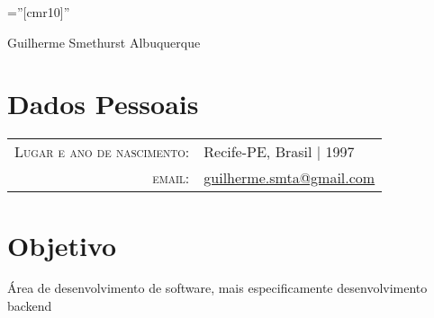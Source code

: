 \documentclass[a4paper,10pt]{article}
\begin{document}

\pagestyle{empty} %

\font\fb=''[cmr10]'' %

\par{\centering
		{\Huge Guilherme Smethurst Albuquerque
	}\bigskip\par}

\section{Dados Pessoais}

\begin{tabular}{rl}
    \textsc{Lugar e ano de nascimento:} & Recife-PE, Brasil  | 1997 \\
    \textsc{email:}     &  \href{mailto:guilherme.smta@gmail.com}{guilherme.smta@gmail.com}
\end{tabular}

\section{Objetivo}
Área de desenvolvimento de software, mais especificamente desenvolvimento backend

\end{document}
